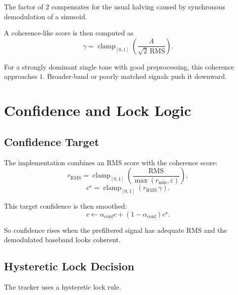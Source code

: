 \documentclass[conference]{IEEEtran}
\begin{document}
    The factor of \(2\) compensates for the usual halving caused by synchronous
    demodulation of a sinusoid.

    A coherence-like score is then computed as
    \begin{equation}
        \gamma
        =
        \operatorname{clamp}_{[0,1]}
        \left(
        \frac{A}{\sqrt{2}\,\mathrm{RMS}}
        \right).
    \end{equation}

    For a strongly dominant single tone with good preprocessing, this coherence
    approaches \(1\). Broader-band or poorly matched signals push it downward.

    \section{Confidence and Lock Logic}\label{sec:lock}

    \subsection{Confidence Target}

    The implementation combines an RMS score with the coherence score:
    \begin{equation}
        r_{\mathrm{RMS}}
        =
        \operatorname{clamp}_{[0,1]}
        \left(
        \frac{\mathrm{RMS}}{\max(r_{\min},\varepsilon)}
        \right),
    \end{equation}
    \begin{equation}
        c^\star
        =
        \operatorname{clamp}_{[0,1]}(r_{\mathrm{RMS}}\,\gamma).
    \end{equation}

    This target confidence is then smoothed:
    \begin{equation}
        c \leftarrow \alpha_{\mathrm{conf}} c + (1-\alpha_{\mathrm{conf}})c^\star.
    \end{equation}

    So confidence rises when the prefiltered signal has adequate RMS and the
    demodulated baseband looks coherent.

    \subsection{Hysteretic Lock Decision}

    The tracker uses a hysteretic lock rule.
\end{document}
